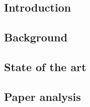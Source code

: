 \documentclass[11pt]{article}
\begin{document}

\subsection*{Introduction}


\subsection*{Background}


\subsection*{State of the art}


\subsection*{Paper analysis}




{}

\end{document}
